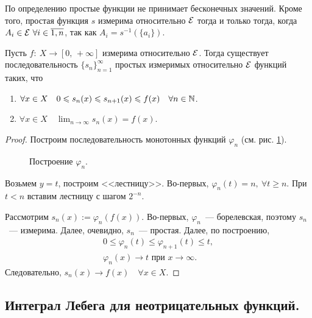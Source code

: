 \begin{remark}
    По определению простые функции не принимает бесконечных значений. Кроме того,
    простая функция $s$ измерима относительно $\mathcal{E}$ тогда и только тогда, когда $A_i\in\mathcal{E}\ \forall i\in\overline{1,n}$,
    так как $A_i=s^{-1}(\{a_i\})$.
\end{remark}

\begin{claim}
    Пусть $f:\: X\to[0,\,+\infty]$ измерима относительно $\mathcal{E}$. Тогда существует последовательность
    $\{s_n\}_{n=1}^{\infty}$ простых измеримых относительно $\mathcal{E}$ функций таких, что
    \begin{enumerate}
        \item $\forall x\in X\quad 0\leqslant s_n(x)\leqslant s_{n+1}(x)\leqslant f(x)\quad\forall n\in\mathbb{N}$.
        \item $\forall x\in X\quad \lim_{n\to\infty} s_n(x)=f(x)$.
    \end{enumerate}

    \begin{proof}

        Построим последовательность монотонных функций $\varphi_n$ (см. рис. \ref{fig:lect12:stairs}).

        \begin{figure}[!ht]
            \centering
            
            \caption{Построение $\varphi_n$.}
            \label{fig:lect12:stairs}
        \end{figure}

        Возьмем $y=t$, построим <<лестницу>>. Во-первых, $\varphi_n(t)=n,\ \forall t\geqslant n$. При $t<n$ вставим
        лестницу с шагом $2^{-n}$.

        Рассмотрим $s_n(x):=\varphi_n(f(x))$. Во-первых, $\varphi_n$~--- борелевская, поэтому $s_n$~--- измерима.
        Далее, очевидно, $s_n$~--- простая.
        Далее, по построению, \begin{gather*}
            0\leqslant\varphi_n(t)\leqslant\varphi_{n+1}(t)\leqslant t,\\
            \varphi_n(x)\to t\text{ при } x\to\infty.
        \end{gather*}
        Следовательно, $s_n(x)\to f(x)\quad \forall x\in X$.

    \end{proof}
\end{claim}

\subsection{Интеграл Лебега для неотрицательных функций.}

